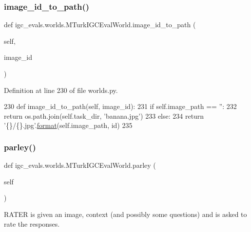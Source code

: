 \subsubsection{\texorpdfstring{image\+\_\+id\+\_\+to\+\_\+path()}{image\_id\_to\_path()}}
{\footnotesize\ttfamily def igc\+\_\+evals.\+worlds.\+M\+Turk\+I\+G\+C\+Eval\+World.\+image\+\_\+id\+\_\+to\+\_\+path (\begin{DoxyParamCaption}\item[{}]{self,  }\item[{}]{image\+\_\+id }\end{DoxyParamCaption})}



Definition at line 230 of file worlds.\+py.


\begin{DoxyCode}
230     \textcolor{keyword}{def }image\_id\_to\_path(self, image\_id):
231         \textcolor{keywordflow}{if} self.image\_path == \textcolor{stringliteral}{''}:
232             \textcolor{keywordflow}{return} os.path.join(self.task\_dir, \textcolor{stringliteral}{'banana.jpg'})
233         \textcolor{keywordflow}{else}:
234             \textcolor{keywordflow}{return} \textcolor{stringliteral}{'\{\}/\{\}.jpg'}.\hyperlink{namespaceparlai_1_1chat__service_1_1services_1_1messenger_1_1shared__utils_a32e2e2022b824fbaf80c747160b52a76}{format}(self.image\_path, id)
235 
\end{DoxyCode}
\mbox{\label{classigc__evals_1_1worlds_1_1MTurkIGCEvalWorld_ab2ddf25bf050e7f12d675dc910c04a3d}} 
\subsubsection{\texorpdfstring{parley()}{parley()}}
{\footnotesize\ttfamily def igc\+\_\+evals.\+worlds.\+M\+Turk\+I\+G\+C\+Eval\+World.\+parley (\begin{DoxyParamCaption}\item[{}]{self }\end{DoxyParamCaption})}

\begin{DoxyVerb}RATER is given an image, context (and possibly some questions) and is asked to
rate the responses.
\end{DoxyVerb}
 


